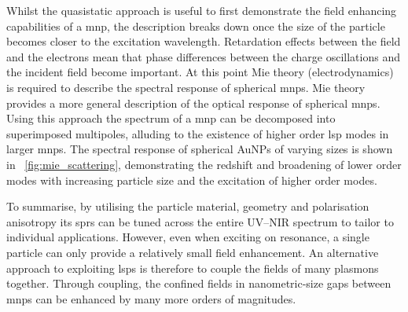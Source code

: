 \documentclass{article}
\begin{document}
Whilst the quasistatic approach is useful to first demonstrate the field enhancing capabilities of a \gls{mnp}, the description breaks down once the size of the particle becomes closer to the excitation wavelength. Retardation effects between the field and the electrons mean that phase differences between the charge oscillations and the incident field become important. At this point Mie theory (electrodynamics) \cite{mie1908} is required to describe the spectral response of spherical \glspl{mnp}. Mie theory provides a more general description of the optical response of spherical \glspl{mnp}. Using this approach the spectrum of a \gls{mnp} can be decomposed into superimposed multipoles, alluding to the existence of higher order \gls{lsp} modes in larger \glspl{mnp}. The spectral response of spherical AuNPs of varying sizes is shown in \figurename~\ref{fig:mie_scattering}, demonstrating the redshift and broadening of lower order modes with increasing particle size and the excitation of higher order modes.

To summarise, by utilising the particle material, geometry and polarisation anisotropy its \glspl{spr} can be tuned across the entire UV--NIR spectrum to tailor to individual applications. However, even when exciting on resonance, a single particle can only provide a relatively small field enhancement. An alternative approach to exploiting \glspl{lsp} is therefore to couple the fields of many plasmons together. Through coupling, the confined fields in nanometric-size gaps between \glspl{mnp} can be enhanced by many more orders of magnitudes.
\end{document}

